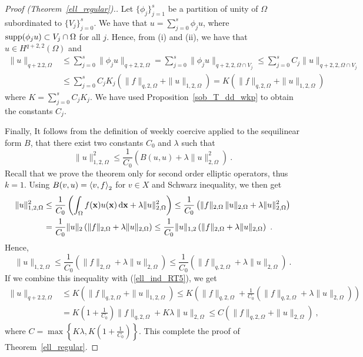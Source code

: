 \begin{proof}[Proof (Theorem~\ref{ell_regular}).]
 Let $\displaystyle \{\phi_j\}_{j=1}^s$ be a partition of unity of
$\Omega$ subordinated to $\displaystyle \{ V_j \}_{j=0}^s$.
We have that $\displaystyle u = \sum_{j=0}^s \phi_j u$, where
$\operatorname{supp} (\phi_j u) \subset V_j \cap \Omega$ for all $j$.  Hence,
from (i) and (ii), we have that $\displaystyle u\in H^{q+2,2}(\Omega)$ and
\begin{align}
\|u\|_{q+2.2,\Omega} &\leq \sum_{j=0}^s \| \phi_j u\|_{q+2,2,\Omega}
= \sum_{j=0}^s \| \phi_j u\|_{q+2,2,\Omega \cap V_j}
\leq \sum_{j=0}^s C_j \|u\|_{q+2,2,\Omega \cap V_j} \nonumber \\
&\leq \sum_{j=0}^s C_j K_j \left( \|f\|_{q,2,\Omega} + \|u\|_{1,2,\Omega} \right)
= K \left( \|f\|_{q,2,\Omega} + \|u\|_{1,2,\Omega} \right)  \label{ell_ind_RT5}
\end{align}
where $\displaystyle K = \sum_{j=0}^s C_j K_j$.  We have used
Proposition~\ref{sob_T_dd_wkp} to obtain the constants $C_j$.

 Finally, It follows from the definition of weekly coercive
applied to the sequilinear form $B$, that there exist two constants
$C_0$ and $\lambda$ such that
\[
\|u \|_{1,2,\Omega}^2
\leq \frac{1}{C_0} \left( B(u,u) + \lambda \|u\|_{2,\Omega}^2\right) \ .
\]
Recall that we prove the theorem only for second order elliptic
operators, thus $k=1$.  Using $B(v,u) = \left\langle{v} , {f}\right\rangle_2$ for $v\in X$ and
Schwarz inequality, we then get
\begin{align*}
\|u \|_{1,2,\Omega}^2 &\leq
\frac{1}{C_0} \left( \int_{\Omega} f(\mathbf{x}) u(\mathbf{x}) \,\mathrm{d}{\mathbf{x}}
+ \lambda \|u\|_{2,\Omega}^2\right)
\leq \frac{1}{C_0} \left( \|f\|_{2,\Omega} \, \| u \|_{2,\Omega}
+\lambda \|u\|_{2,\Omega}^2\right)\\
&= \frac{1}{C_0} \|u\|_2 \left( \|f\|_{2,\Omega} +\lambda \|u\|_{2,\Omega}\right)
\leq \frac{1}{C_0} \|u\|_{1,2} \left( \|f\|_{2,\Omega}
+\lambda \|u\|_{2,\Omega}\right) \ .
\end{align*}
Hence,
\[
\|u \|_{1,2,\Omega} \leq \frac{1}{C_0} \left( \|f\|_{2,\Omega}
  +\lambda \|u\|_{2,\Omega} \right)
\leq \frac{1}{C_0} \left( \|f\|_{q,2,\Omega} +\lambda \|u\|_{2,\Omega} \right) \ .
\]
If we combine this inequality with (\ref{ell_ind_RT5}), we get
\begin{align*}
\|u\|_{q+2.2,\Omega} &\leq 
K \left( \|f\|_{q,2,\Omega} + \|u\|_{1,2,\Omega} \right)
\leq K \left( \|f\|_{q,2,\Omega} + \frac{1}{C_0} \left( \|f\|_{q,2,\Omega}
+\lambda \|u\|_{2,\Omega}\right) \right) \\
&= K \left(1+ \frac{1}{C_0} \right) \|f\|_{q,2,\Omega}
+ K \lambda \|u\|_{2,\Omega}
\leq C \left( \|f\|_{q,2,\Omega} + \|u\|_{2,\Omega}\right) \ ,
\end{align*}
where $\displaystyle C = \max\left\{K\lambda,
K \left(1+ \frac{1}{C_0}\right)\right\}$.
This complete the proof of Theorem~\ref{ell_regular}.
\end{proof}

